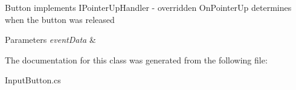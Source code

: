 Button implements I\+Pointer\+Up\+Handler -\/ overridden On\+Pointer\+Up determines when the button was released 


\begin{DoxyParams}{Parameters}
{\em event\+Data} & \\
\hline
\end{DoxyParams}


The documentation for this class was generated from the following file\+:\begin{DoxyCompactItemize}
\item 
Input\+Button.\+cs\end{DoxyCompactItemize}
